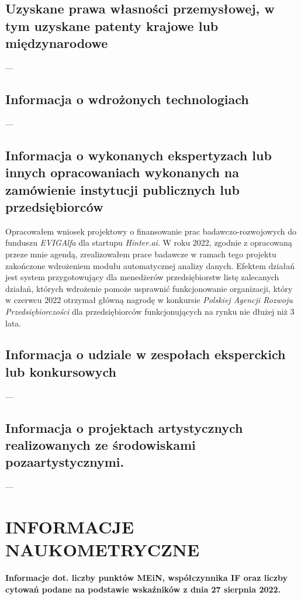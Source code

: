 \begin{fullwidth}
	
\subsection{Uzyskane prawa własności przemysłowej, w tym uzyskane patenty krajowe lub międzynarodowe}
---

\subsection{Informacja o wdrożonych technologiach}
---

\subsection{Informacja o wykonanych ekspertyzach lub innych opracowaniach wykonanych na zamówienie instytucji publicznych lub przedsiębiorców}

\end{fullwidth}
Opracowałem wniosek projektowy o finansowanie prac badawczo-rozwojowych do funduszu \emph{EVIGAlfa} dla startupu \emph{Hinter.ai}. W roku 2022, zgodnie z opracowaną przeze mnie agendą, zrealizowałem prace badawcze w ramach tego projektu zakończone wdrożeniem modułu automatycznej analizy danych. Efektem działań jest system przygotowujący dla menedżerów przedsiębiorstw listę zalecanych działań, których wdrożenie pomoże usprawnić funkcjonowanie organizacji, który w czerwcu 2022 otrzymał główną nagrodę w konkursie \emph{Polskiej Agencji Rozwoju Przedsiębiorczości} dla przedsiębiorców funkcjonujących na rynku nie dłużej niż 3 lata.

\begin{fullwidth}

\subsection{Informacja o udziale w zespołach eksperckich lub konkursowych}
---

\subsection{Informacja o projektach artystycznych realizowanych ze środowiskami pozaartystycznymi.}
---

\newpage


\section{INFORMACJE NAUKOMETRYCZNE}


\begin{center}
	\bfseries Informacje dot. liczby punktów MEiN, współczynnika IF oraz liczby cytowań podane na podstawie wskaźników z dnia 27 sierpnia 2022.
\end{center}

\end{fullwidth}
		
